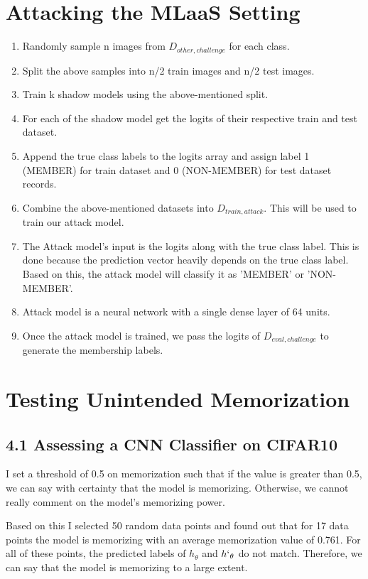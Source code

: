 \section{Attacking the MLaaS Setting}
\begin{enumerate}
    \item Randomly sample n images from $D_{other,challenge}$ for each class.
    \item Split the above samples into n/2 train images and n/2 test images.
    \item Train k shadow models using the above-mentioned split.
    \item For each of the shadow model get the logits of their respective train and test dataset.
    \item Append the true class labels to the logits array and assign label 1 (MEMBER) for train dataset and 0 (NON-MEMBER) for test dataset records.
    \item Combine the above-mentioned datasets into $D_{train, attack}$. This will be used to train our attack model.
    \item The Attack model’s input is the logits along with the true class label. This is done because the prediction vector heavily depends on the true class label. Based on this, the attack model will classify it as 'MEMBER' or 'NON-MEMBER'.
    \item Attack model is a neural network with a single dense layer of 64 units.
    \item Once the attack model is trained, we pass the logits of $D_{eval,challenge}$ to generate the membership labels.
\end{enumerate}

\section{Testing Unintended Memorization}
    
\subsection*{4.1 Assessing a CNN Classiﬁer on CIFAR10}

I set a threshold of 0.5 on memorization such that if the value is greater than 0.5, we can say with certainty that the model is memorizing. Otherwise, we cannot really comment on the model's memorizing power.

Based on this I selected 50 random data points and found out that for 17 data points
the model is memorizing with an average memorization value of 0.761. For all of these points,
the predicted labels of $h_{\theta}$ and $h`_{\theta}$ do not match. Therefore, we can say that the model is memorizing to a large extent.

